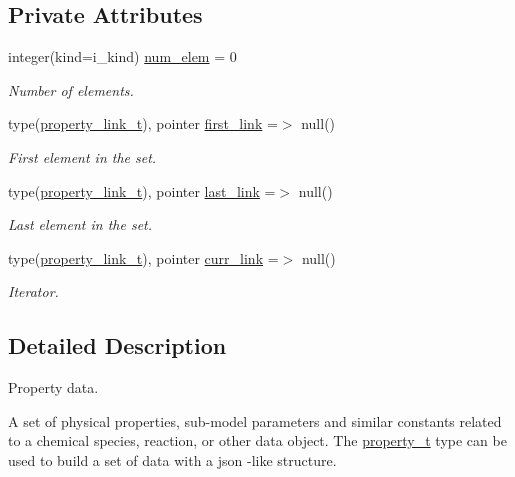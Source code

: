 \subsection*{Private Attributes}
\begin{DoxyCompactItemize}
\item 
integer(kind=i\+\_\+kind) \mbox{\hyperlink{structpmc__property_1_1property__t_a86c7def7b825d018cb0cb9dc1c5a80aa}{num\+\_\+elem}} = 0
\begin{DoxyCompactList}\small\item\em Number of elements. \end{DoxyCompactList}\item 
type(\mbox{\hyperlink{structpmc__property_1_1property__link__t}{property\+\_\+link\+\_\+t}}), pointer \mbox{\hyperlink{structpmc__property_1_1property__t_a63b8850c3410ddd8418a200658f34066}{first\+\_\+link}} =$>$ null()
\begin{DoxyCompactList}\small\item\em First element in the set. \end{DoxyCompactList}\item 
type(\mbox{\hyperlink{structpmc__property_1_1property__link__t}{property\+\_\+link\+\_\+t}}), pointer \mbox{\hyperlink{structpmc__property_1_1property__t_abfc2553c9fe9be9eae86248ae81f3771}{last\+\_\+link}} =$>$ null()
\begin{DoxyCompactList}\small\item\em Last element in the set. \end{DoxyCompactList}\item 
type(\mbox{\hyperlink{structpmc__property_1_1property__link__t}{property\+\_\+link\+\_\+t}}), pointer \mbox{\hyperlink{structpmc__property_1_1property__t_a62b52c857f71e699bdb0e9cc8bc5da26}{curr\+\_\+link}} =$>$ null()
\begin{DoxyCompactList}\small\item\em Iterator. \end{DoxyCompactList}\end{DoxyCompactItemize}


\subsection{Detailed Description}
Property data. 

A set of physical properties, sub-\/model parameters and similar constants related to a chemical species, reaction, or other data object. The {\ttfamily \mbox{\hyperlink{structpmc__property_1_1property__t}{property\+\_\+t}}} type can be used to build a set of data with a {\ttfamily json} -\/like structure. 

